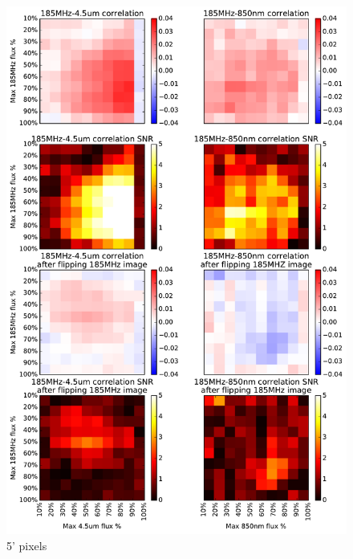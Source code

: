 \documentclass[preprint]{aastex}
\begin{document}
\begin{figure}[h]
\centering
\includegraphics[width=5.5in]{images/source_correlation_grids_and_snrs.pdf}
\caption{5' pixels}
\label{fig:correlationsandSNRs}
\end{figure}
\end{document}

